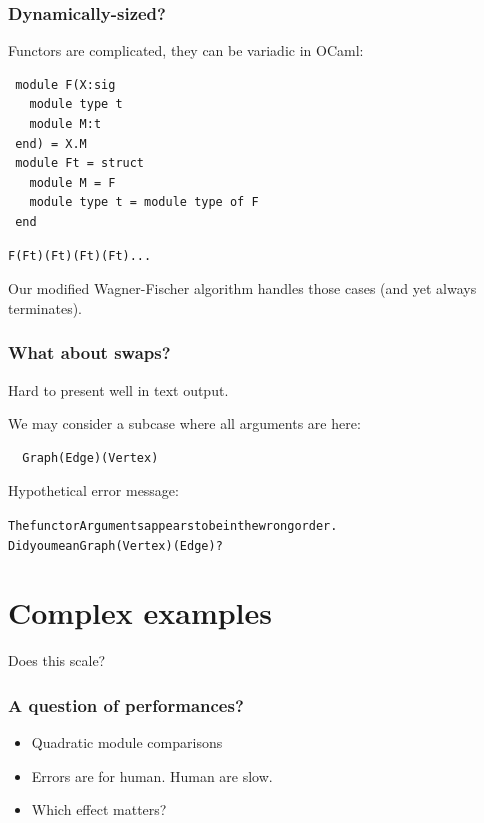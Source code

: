 \documentclass[11pt,aspectratio=169]{beamer}
\begin{document}
\begin{frame}[fragile]\frametitle{Dynamically-sized?}
  Functors are complicated, they can be variadic in OCaml:
   \begin{verbatim}
 module F(X:sig
   module type t
   module M:t
 end) = X.M
 module Ft = struct
   module M = F
   module type t = module type of F
 end
\end{verbatim}

\begin{verbatim}
F(Ft)(Ft)(Ft)(Ft)...
\end{verbatim}

  Our modified Wagner-Fischer algorithm handles those cases (and yet always terminates).
\end{frame}

\begin{frame}[fragile]\frametitle{What about swaps?}
  Hard to present well in text output.

  We may consider a subcase where all arguments are here:
\begin{verbatim}
  Graph(Edge)(Vertex)
\end{verbatim}

Hypothetical error message:
\begin{alltt}
The functor Arguments appears to be in the wrong order.
Did you mean Graph(Vertex)(Edge)?
\end{alltt}


\end{frame}



\section{Complex examples}

\begin{frame}[standout]
  \centering \Huge Does this scale?
\end{frame}


\begin{frame}[fragile] \frametitle{A question of performances?}
  \begin{itemize}
    \item{Quadratic module comparisons}
    \item{Errors are for human. Human are slow.}
    \item{Which effect matters?}
  \end{itemize}
\end{frame}
\end{document}
